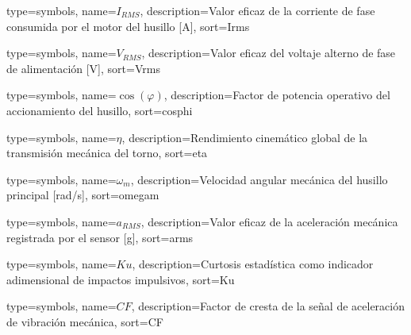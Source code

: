 {
    type=symbols,
    name={\ensuremath{I_{RMS}}},
    description={Valor eficaz de la corriente de fase consumida por el motor del husillo [A]},
    sort=Irms
}

{
    type=symbols,
    name={\ensuremath{V_{RMS}}},
    description={Valor eficaz del voltaje alterno de fase de alimentación [V]},
    sort=Vrms
}

{
    type=symbols,
    name={\ensuremath{\cos(\varphi)}},
    description={Factor de potencia operativo del accionamiento del husillo},
    sort=cosphi
}

{
    type=symbols,
    name={\ensuremath{\eta}},
    description={Rendimiento cinemático global de la transmisión mecánica del torno},
    sort=eta
}

{
    type=symbols,
    name={\ensuremath{\omega_m}},
    description={Velocidad angular mecánica del husillo principal [rad/s]},
    sort=omegam
}

{
    type=symbols,
    name={\ensuremath{a_{RMS}}},
    description={Valor eficaz de la aceleración mecánica registrada por el sensor [g]},
    sort=arms
}

{
    type=symbols,
    name={\ensuremath{Ku}},
    description={Curtosis estadística como indicador adimensional de impactos impulsivos},
    sort=Ku
}

{
    type=symbols,
    name={\ensuremath{CF}},
    description={Factor de cresta de la señal de aceleración de vibración mecánica},
    sort=CF
}